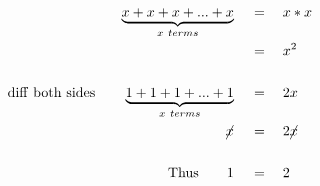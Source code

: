 \begin{align*}
\underbrace{x+x+x+...+x}_{x~terms}\quad&\,=\quad x*x\\
\,&\,=\quad x^2\\ \\
\mathrm{diff~both~sides}\qquad\underbrace{1+1+1+...+1}_{x~terms}\quad&\,=\quad2x\\
\cancel{x}\quad&\,=\quad2\cancel{x}\\ \\
\mathrm{Thus}\qquad1\quad&\,=\quad2
\end{align*}
